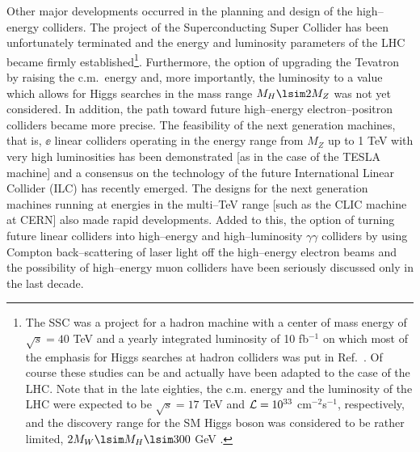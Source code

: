 Other major developments occurred in the planning and design of the
high--energy colliders. The project of the Superconducting Super Collider has
been unfortunately terminated and the energy and luminosity parameters of the
LHC became firmly established\footnote{The SSC was a project for a hadron
machine with a center of mass energy of $\sqrt{s}=40$ TeV and a yearly
integrated luminosity of 10 fb$^{-1}$ on which most of the emphasis for Higgs
searches at hadron colliders was put in Ref.~\cite{HHG}. Of course these
studies can be and actually have been adapted to the case of the LHC. Note
that in the late eighties, the c.m.  energy and the luminosity of the LHC were
expected to be $\sqrt{s}=17$ TeV and ${\cal L}=10^{33}$ cm$^{-2}$s$^{-1}$,
respectively, and the discovery range for the SM Higgs boson was considered to
be rather limited, $2M_W \lsim M_H \lsim 300$ GeV \cite{HHG}.}.  Furthermore,
the option of upgrading the Tevatron by raising the c.m.~energy and, more
importantly, the luminosity to a value which allows for Higgs searches in the
mass range $M_H \lsim 2M_Z$ was not yet considered. In addition, the path
toward future high--energy electron--positron colliders became more precise. 
The feasibility of the next generation machines, that is, $\ee$ linear
colliders operating in the energy range from $M_Z$ up to 1 TeV with very high
luminosities has been demonstrated [as in the case of the TESLA machine] and a
consensus on the technology of the future International Linear Collider (ILC)
has recently emerged. The designs for the next generation machines running at
energies in the multi--TeV range [such as the CLIC machine at CERN] also made
rapid developments.  Added to this, the option of turning future linear
colliders into high--energy and high--luminosity $\gamma \gamma$ colliders by
using Compton back--scattering of laser light off the high--energy electron
beams and the possibility of high--energy muon colliders have been seriously
discussed only in the last decade. \s

